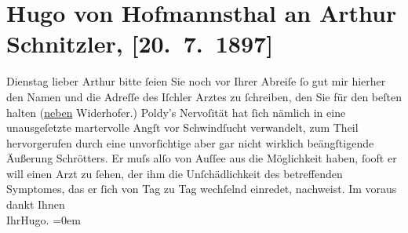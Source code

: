 

         
         \renewcommand{\erwaehntePersonen}{Personen: Leopold von Andrian-Werburg, Leopold Schrötter von Kristelli, Hermann Widerhofer}
         \renewcommand{\erwaehnteOrte}{Orte: Altaussee, Bad Fusch, Bad Ischl, Wien}
         \renewcommand{\erwaehnteWerke}{}
               \section[Hugo von Hofmannsthal an Arthur Schnitzler, {[}20. 7. 1897{]}]{ Hugo von Hofmannsthal an Arthur Schnitzler, {[}20. 7. 1897{]}}\nopagebreak{}\rehead{ }\begin{ledgroupsized}[t]{13cm}\normalsize\beginnumbering \toendnotes[C]{\smallbreak\pagebreak[2]} 
\pstart
           \raggedleft{}{\pb}Dienstag\pend
           \pstart{}lieber Arthur\pend\pstart
           bitte ſeien Sie noch vor Ihrer Abreiſe ſo gut mir hierher den Namen und die Adreſſe
               des Iſchler Arztes zu ſchreiben, den Sie für den
               beſten halten (\uline{neben}{ }Widerhofer.) Poldy’s Nervoſität hat ſich nämlich in eine unausgeſetzte martervolle Angſt
               vor Schwindſucht {\pb}verwandelt, zum
               Theil hervorgerufen durch eine unvorſichtige aber gar nicht wirklich beängſtigende
               Äußerung Schrötters. Er muſs alſo von Auſſee aus die Möglichkeit haben, ſooft er will
               einen Arzt zu ſehen, der ihm die Unſchädlichkeit {\pb}des betreffenden Symptomes, das er
               ſich von Tag zu Tag wechſelnd einredet, nachweist.\pend
           \pstart
           Im voraus dankt Ihnen{\\[\baselineskip]} Ihr\spacefill\mbox{Hugo.}\pend
           \leftskip=0em{}
         
         \endnumbering{}\end{ledgroupsized}  \newcommand{\dateiname}{L00708}\newcommand{\titel}{Hugo von Hofmannsthal an Arthur Schnitzler, [20. 7. 1897]}\newcommand{\editorInnen}{Martin Anton Müller und Gerd-Hermann Susen}
      